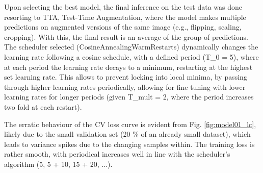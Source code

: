 \documentclass[conference]{IEEEtran}
\begin{document}

Upon selecting the best model, the final inference on the test data was done resorting to TTA, Test-Time Augmentation, where the model makes multiple predictions on augmented versions of the same image (e.g., flipping, scaling, cropping). With this, the final result is an average of the group of predictions. The scheduler selected (CosineAnnealingWarmRestarts) dynamically changes the learning rate following a cosine schedule, with a defined period (T\_0 = 5), where at each period the learning rate decays to a minimum, restarting at the highest set learning rate. This allows to prevent locking into local minima, by passing through higher learning rates periodically, allowing for fine tuning with lower learning rates for longer periods (given T\_mult = 2, where the period increases two fold at each restart).

The erratic behaviour of the CV loss curve is evident from Fig. \ref{fig:model01_lc}, likely due to the small validation set (20 \% of an already small dataset), which leads to variance spikes due to the changing samples within. The training loss is rather smooth, with periodical increases well in line with the scheduler's algorithm (5, 5 + 10, 15 + 20, ...).

\end{document}

